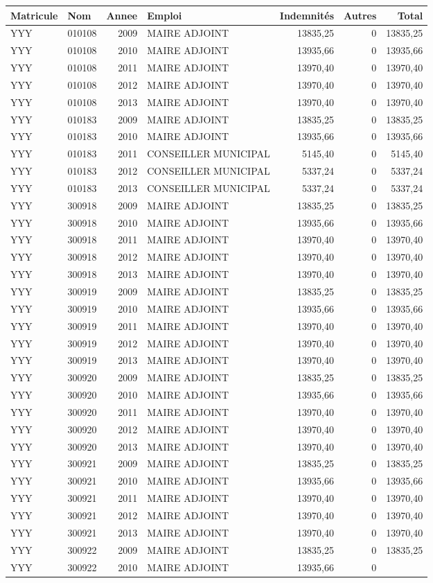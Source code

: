 \begin{longtable}[]{@{}llrlrrr@{}}
\toprule
Matricule & Nom & Annee & Emploi & Indemnités & Autres &
Total\tabularnewline
\midrule
\endhead
YYY & 010108 & 2009 & MAIRE ADJOINT & 13835,25 & 0 &
13835,25\tabularnewline
YYY & 010108 & 2010 & MAIRE ADJOINT & 13935,66 & 0 &
13935,66\tabularnewline
YYY & 010108 & 2011 & MAIRE ADJOINT & 13970,40 & 0 &
13970,40\tabularnewline
YYY & 010108 & 2012 & MAIRE ADJOINT & 13970,40 & 0 &
13970,40\tabularnewline
YYY & 010108 & 2013 & MAIRE ADJOINT & 13970,40 & 0 &
13970,40\tabularnewline
YYY & 010183 & 2009 & MAIRE ADJOINT & 13835,25 & 0 &
13835,25\tabularnewline
YYY & 010183 & 2010 & MAIRE ADJOINT & 13935,66 & 0 &
13935,66\tabularnewline
YYY & 010183 & 2011 & CONSEILLER MUNICIPAL & 5145,40 & 0 &
5145,40\tabularnewline
YYY & 010183 & 2012 & CONSEILLER MUNICIPAL & 5337,24 & 0 &
5337,24\tabularnewline
YYY & 010183 & 2013 & CONSEILLER MUNICIPAL & 5337,24 & 0 &
5337,24\tabularnewline
YYY & 300918 & 2009 & MAIRE ADJOINT & 13835,25 & 0 &
13835,25\tabularnewline
YYY & 300918 & 2010 & MAIRE ADJOINT & 13935,66 & 0 &
13935,66\tabularnewline
YYY & 300918 & 2011 & MAIRE ADJOINT & 13970,40 & 0 &
13970,40\tabularnewline
YYY & 300918 & 2012 & MAIRE ADJOINT & 13970,40 & 0 &
13970,40\tabularnewline
YYY & 300918 & 2013 & MAIRE ADJOINT & 13970,40 & 0 &
13970,40\tabularnewline
YYY & 300919 & 2009 & MAIRE ADJOINT & 13835,25 & 0 &
13835,25\tabularnewline
YYY & 300919 & 2010 & MAIRE ADJOINT & 13935,66 & 0 &
13935,66\tabularnewline
YYY & 300919 & 2011 & MAIRE ADJOINT & 13970,40 & 0 &
13970,40\tabularnewline
YYY & 300919 & 2012 & MAIRE ADJOINT & 13970,40 & 0 &
13970,40\tabularnewline
YYY & 300919 & 2013 & MAIRE ADJOINT & 13970,40 & 0 &
13970,40\tabularnewline
YYY & 300920 & 2009 & MAIRE ADJOINT & 13835,25 & 0 &
13835,25\tabularnewline
YYY & 300920 & 2010 & MAIRE ADJOINT & 13935,66 & 0 &
13935,66\tabularnewline
YYY & 300920 & 2011 & MAIRE ADJOINT & 13970,40 & 0 &
13970,40\tabularnewline
YYY & 300920 & 2012 & MAIRE ADJOINT & 13970,40 & 0 &
13970,40\tabularnewline
YYY & 300920 & 2013 & MAIRE ADJOINT & 13970,40 & 0 &
13970,40\tabularnewline
YYY & 300921 & 2009 & MAIRE ADJOINT & 13835,25 & 0 &
13835,25\tabularnewline
YYY & 300921 & 2010 & MAIRE ADJOINT & 13935,66 & 0 &
13935,66\tabularnewline
YYY & 300921 & 2011 & MAIRE ADJOINT & 13970,40 & 0 &
13970,40\tabularnewline
YYY & 300921 & 2012 & MAIRE ADJOINT & 13970,40 & 0 &
13970,40\tabularnewline
YYY & 300921 & 2013 & MAIRE ADJOINT & 13970,40 & 0 &
13970,40\tabularnewline
YYY & 300922 & 2009 & MAIRE ADJOINT & 13835,25 & 0 &
13835,25\tabularnewline
YYY & 300922 & 2010 & MAIRE ADJOINT & 13935,66 & 0 &

\end{longtable}
